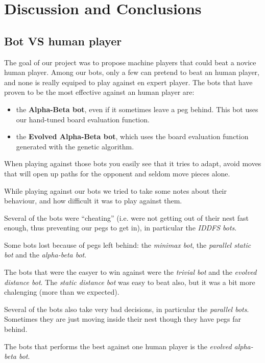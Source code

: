 \section{Discussion and Conclusions}
\subsection{Bot VS human player}
The goal of our project was to propose machine players that could beat a
novice human player. Among our bots, only a few can pretend to beat an human
player, and none is really equiped to play against en expert player. The bots
that have proven to be the most effective against an human player are:

\begin{itemize}
  \item the \textbf{Alpha-Beta bot}, even if it sometimes leave a peg behind.
        This bot uses our hand-tuned board evaluation function.
  \item the \textbf{Evolved Alpha-Beta bot}, which uses the board evaluation
        function generated with the genetic algorithm.
\end{itemize}

When playing against those bots you easily see that it tries to adapt, avoid
moves that will open up paths for the opponent and seldom move pieces alone.

While playing against our bots we tried to take some notes about their
behaviour, and how difficult it was to play against them.

Several of the bots were ``cheating'' (i.e. were not getting out of their
nest fast enough, thus preventing our pegs to get in), in particular the
\textit{IDDFS bots}.

Some bots lost because of pegs left behind: the \textit{minimax bot}, the
\textit{parallel static bot} and the \textit{alpha-beta bot}.

The bots that were the easyer to win against were the \textit{trivial bot} and
the \textit{evolved distance bot}. The \textit{static distance bot} was easy
to beat also, but it was a bit more chalenging (more than we expected).

Several of the bots also take very bad decisions, in particular the \textit{
parallel bots}. Sometimes they are just moving inside their nest though they
have pegs far behind.

The bots that performs the best against one human player is the \textit{
evolved alpha-beta bot}.

